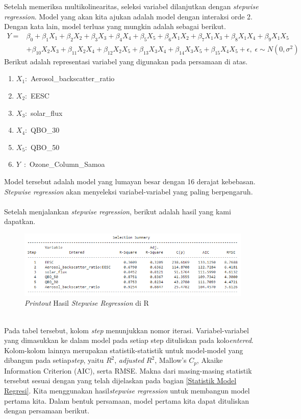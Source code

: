 \begin{enumerate}
\\~\\
Setelah memeriksa multikolinearitas, seleksi variabel dilanjutkan dengan \textit{stepwise regression}. Model yang akan kita ajukan adalah model dengan interaksi orde 2. Dengan kata lain, model terluas yang mungkin adalah sebagai berikut.
\begin{align*}
    Y = &\beta_0 + \beta_1X_1 + \beta_2X_2 + \beta_3X_3 + \beta_4X_4 + \beta_5X_5 + \beta_6X_1X_2 + \beta_7X_1X_3 + \beta_8X_1X_4 + \beta_9X_1X_5\\
    &+ \beta_{10}X_2X_3 + \beta_{11}X_2X_4 + \beta_{12}X_2X_5 + \beta_{13}X_3X_4 + \beta_{14}X_3X_5 + \beta_{15}X_4X_5 + \epsilon,\;\epsilon \sim N(0, \sigma^2)
\end{align*}
Berikut adalah representasi variabel yang digunakan pada persamaan di atas.
\begin{enumerate}
    \item $X_1:$ Aerosol\_backscatter\_ratio
    \item $X_2:$ EESC
    \item $X_3:$ solar\_flux
    \item $X_4:$ QBO\_30
    \item $X_5:$ QBO\_50
    \item $Y\;\: :$ Ozone\_Column\_Samoa
\end{enumerate}
Model tersebut adalah model yang lumayan besar dengan 16 derajat kebebasan. \textit{Stepwise regression} akan menyeleksi variabel-variabel yang paling berpengaruh.
\\~\\
Setelah menjalankan \textit{stepwise regression}, berikut adalah hasil yang kami dapatkan.\\
\begin{figure}[h!]
    \centering
    \includegraphics[scale=0.9]{src/Pics/stepwiseregress.png}
    \caption{\textit{Printout} Hasil \textit{Stepwise Regression} di R}
    \label{fig:my_label}
\end{figure}\\
Pada tabel tersebut, kolom \textit{step} menunjukkan nomor iterasi. Variabel-variabel yang dimasukkan ke dalam model pada setiap step dituliskan pada kolo\textit{entered}. Kolom-kolom lainnya merupakan statistik-statistik untuk model-model yang dibangun pada setiap\textit{step}, yaitu $R^2$, \textit{adjusted} $R^2$, Mallow's $C_p$, Akaike Information Criterion (AIC), serta RMSE.  Makna dari masing-masing statistik tersebut sesuai dengan yang telah dijelaskan pada bagian \ref{Statistik Model Regresi}. Kita menggunakan hasil\textit{stepwise regression} untuk membangun model pertama kita. Dalam bentuk persamaan, model pertama kita dapat dituliskan dengan persamaan berikut.

\end{enumerate}
